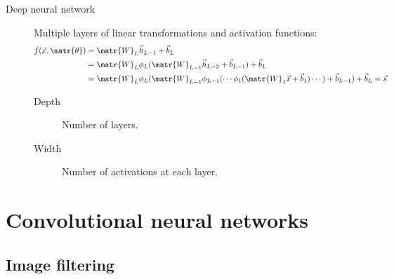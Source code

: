 \begin{description}
    \item[Deep neural network] 
        Multiple layers of linear transformations and activation functions:
        \[
            \begin{split}
                f(\vec{x}, \matr{\theta}) &= \matr{W}_L \vec{h}_{L-1} + \vec{b}_L \\
                    &= \matr{W}_L \phi_L(\matr{W}_{L-1} \vec{h}_{L-2} + \vec{b}_{L-1}) + \vec{b}_L \\
                    &= \matr{W}_L \phi_{L}(\matr{W}_{L-1} \phi_{L-1}(\cdots \phi_{1}(\matr{W}_{1} \vec{x} + \vec{b}_{1}) \cdots) + \vec{b}_{L-1}) + \vec{b}_L = \vec{s} \\
            \end{split}  
        \]

        \begin{description}
            \item[Depth] Number of layers.
            \item[Width] Number of activations at each layer.  
        \end{description}
\end{description}



\section{Convolutional neural networks}


\subsection{Image filtering}

